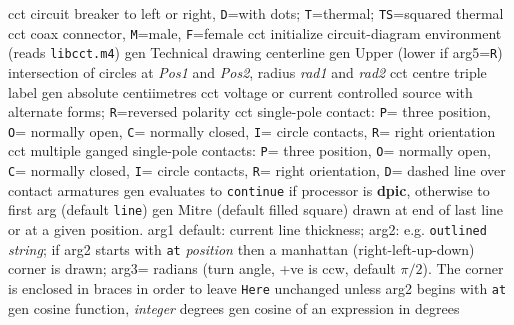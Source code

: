   {cct}
  {circuit breaker to left or right, {\tt D}=with dots; {\tt T}=thermal;
   {\tt TS}=squared thermal}
  {cct}
  {coax connector, {\tt M}=male, {\tt F}=female
    }
  {cct}
  {initialize circuit-diagram environment (reads {\tt libcct.m4})}
  {gen}
  {Technical drawing centerline}
  {gen}
  {Upper (lower if arg5={\tt R}) intersection of circles at
    {\sl Pos1} and {\sl Pos2}, radius {\sl rad1} and {\sl rad2}}
  {cct}
  {centre triple label }
  {gen}
  {absolute centiimetres}
  {cct}
  {voltage or current controlled source with alternate forms;
   {\tt R}=reversed polarity}
  {cct}
  {single-pole contact: {\tt P}= three position, {\tt O}= normally open,
   {\tt C}= normally closed, {\tt I}= circle contacts, {\tt R}= right
   orientation
   }
  {cct}
  {multiple ganged single-pole contacts:
  {\tt P}= three position, {\tt O}= normally open,
   {\tt C}= normally closed, {\tt I}= circle contacts, {\tt R}= right
   orientation, {\tt D}= dashed line over contact armatures
   }
  {gen}
  {evaluates to {\tt continue}
    if processor is {\bf dpic}, otherwise to first arg (default {\tt line})}
  {gen}
  { Mitre (default filled square) drawn at end of last line or at a
    given position.
    arg1 default: current line thickness;
    arg2: e.g. {\tt outlined} {\sl string}; if arg2 starts with
    {\tt at} {\sl position} then a manhattan (right-left-up-down) corner
    is drawn;
    arg3= radians (turn angle, +ve is ccw, default $\pi/2$).
    The corner is enclosed in braces
    in order to leave {\tt Here} unchanged unless arg2 begins with {\tt at}
    }
  {gen}
  {cosine function, {\sl integer\/} degrees}
  {gen}
  {cosine of an expression in degrees}
